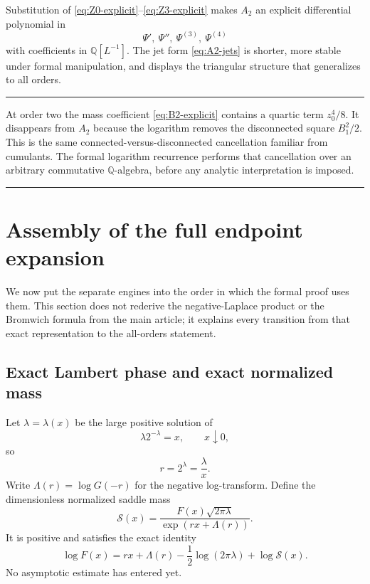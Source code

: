 \documentclass[11pt,oneside]{article}
\theoremstyle{definition}
\theoremstyle{remark}
\newcommand{\Q}{\mathbb Q}
\newenvironment{boxedremark}{%
  \par\smallskip\noindent\begin{center}\begin{minipage}{0.94\textwidth}%
  \color{black}\hrule\vspace{0.6em}\small
}{%
  \vspace{0.6em}\hrule\end{minipage}\end{center}\smallskip
}
\begin{document}
Substitution of \eqref{eq:Z0-explicit}--\eqref{eq:Z3-explicit} makes
$A_2$ an explicit differential polynomial in
\begin{equation}
 \Psi',\ \Psi'',\ \Psi^{(3)},\ \Psi^{(4)}
 \label{eq:A2-derivatives}
\end{equation}
with coefficients in $\Q[L^{-1}]$.  The jet form \eqref{eq:A2-jets} is shorter, more stable
under formal manipulation, and displays the triangular structure that generalizes to all
orders.

\begin{boxedremark}
At order two the mass coefficient \eqref{eq:B2-explicit} contains a quartic term
$z_0^4/8$.  It disappears from $A_2$ because the logarithm removes the disconnected square
$B_1^2/2$.  This is the same connected-versus-disconnected cancellation familiar from
cumulants.  The formal logarithm recurrence performs that cancellation over an arbitrary
commutative $\Q$-algebra, before any analytic interpretation is imposed.
\end{boxedremark}

\section{Assembly of the full endpoint expansion}
\label{sec:full-assembly}

We now put the separate engines into the order in which the formal proof uses them.  This
section does not rederive the negative-Laplace product or the Bromwich formula from the main
article; it explains every transition from that exact representation to the all-orders
statement.

\subsection{Exact Lambert phase and exact normalized mass}

Let $\lambda=\lambda(x)$ be the large positive solution of
\begin{equation}
 \lambda2^{-\lambda}=x,
 \qquad x\downarrow0,
 \label{eq:exact-lambert-phase}
\end{equation}
so
\begin{equation}
 r=2^\lambda=\frac{\lambda}{x}.
 \label{eq:saddle-radius-r}
\end{equation}
Write $\Lambda(r)=\log G(-r)$ for the negative log-transform.  Define the dimensionless
normalized saddle mass
\begin{equation}
 \mathcal S(x)=
 \frac{F(x)\sqrt{2\pi\lambda}}
      {\exp(rx+\Lambda(r))}.
 \label{eq:normalized-saddle-mass}
\end{equation}
It is positive and satisfies the exact identity
\begin{equation}
 \log F(x)=rx+\Lambda(r)-\frac12\log(2\pi\lambda)+\log\mathcal S(x).
 \label{eq:exact-log-saddle-supp}
\end{equation}
No asymptotic estimate has entered yet.
\end{document}
